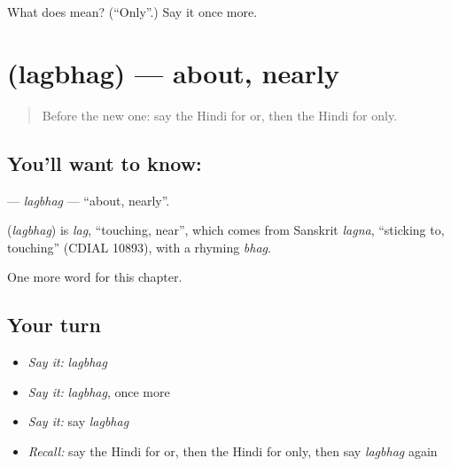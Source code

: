 \begin{tcolorbox}[breakable,colback=teal!4,colframe=teal!35!black,title={Before you move on}]
What does  mean? (\textquotedblleft{}Only\textquotedblright{}.) Say it once more.
\end{tcolorbox}
\section[\texorpdfstring{\hi{लगभग} (lagbhag)}{लगभग (lagbhag)}]{ (lagbhag) — about, nearly}

\label{lesson:HI-C248-lagbhag}



\begin{quote}
Before the new one: say the Hindi for or, then the Hindi for only.
\end{quote}

\subsection*{You'll want to know: }
\textbf{} — \emph{lagbhag} — \textquotedblleft{}about, nearly\textquotedblright{}.

\begin{cousinweb}
\textbf{} (\emph{lagbhag}) is \emph{lag}, \textquotedblleft{}touching, near\textquotedblright{}, which comes from Sanskrit \emph{lagna}, \textquotedblleft{}sticking to, touching\textquotedblright{} (CDIAL 10893), with a rhyming \emph{bhag}.
\end{cousinweb}

\begin{grammarlens}[title={What you've built}]
One more word for this chapter.
\end{grammarlens}

\subsection*{Your turn}
\begin{itemize}
\raggedright
  \item \emph{Say it:} \emph{lagbhag}
  \item \emph{Say it:} \emph{lagbhag}, once more
  \item \emph{Say it:} say \emph{lagbhag}
  \item \emph{Recall:} say the Hindi for or, then the Hindi for only, then say \emph{lagbhag} again
\end{itemize}

